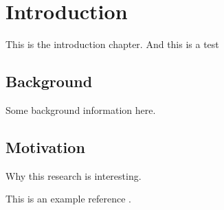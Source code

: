 \chapter*{Introduction}
This is the introduction chapter. And this is a test

\section{Background}
Some background information here.

\section{Motivation}
Why this research is interesting.

This is an example reference \cite{riviere2008}.
